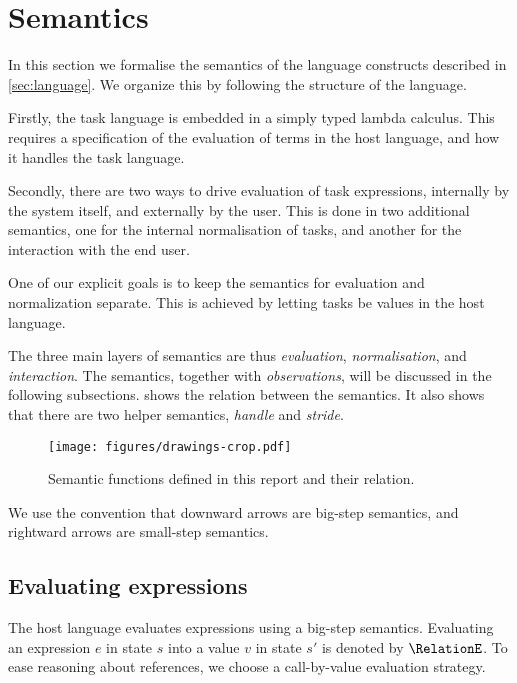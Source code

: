 


\section{Semantics}
\label{sec:semantics}

In this section we formalise the semantics of the language constructs described in \cref{sec:language}.
We organize this by following the structure of the language.

Firstly, the task language is embedded in a simply typed lambda calculus.
This requires a specification of the evaluation of terms in the host language, and how it handles the task language.

Secondly, there are two ways to drive evaluation of task expressions, internally by the system itself, and externally by the user.
This is done in two additional semantics, one for the internal normalisation of tasks, and another for the interaction with the end user.

One of our explicit goals is to keep the semantics for evaluation and normalization separate.
This is achieved by letting tasks be values in the host language.

The three main layers of semantics are thus \emph{evaluation}, \emph{normalisation}, and \emph{interaction}.
The semantics, together with \emph{observations}, will be discussed in the following subsections.
 shows the relation between the semantics.
It also shows that there are two helper semantics, \emph{handle} and \emph{stride}.

\begin{figure}[h]
  \centering
  \texttt{[image: figures/drawings-crop.pdf]}
  \caption{
    Semantic functions defined in this report and their relation.
  }
  \label{fig:semantic-functions}
\end{figure}

We use the convention that downward arrows are big-step semantics, and rightward arrows are small-step semantics.



\subsection{Evaluating expressions}
\label{sec:evaluation}

The host language evaluates expressions using a big-step semantics.
Evaluating an expression $e$ in state $s$ into a value $v$ in state $s'$ is denoted by $\RelationE$.
To ease reasoning about references, we choose a call-by-value evaluation strategy.

